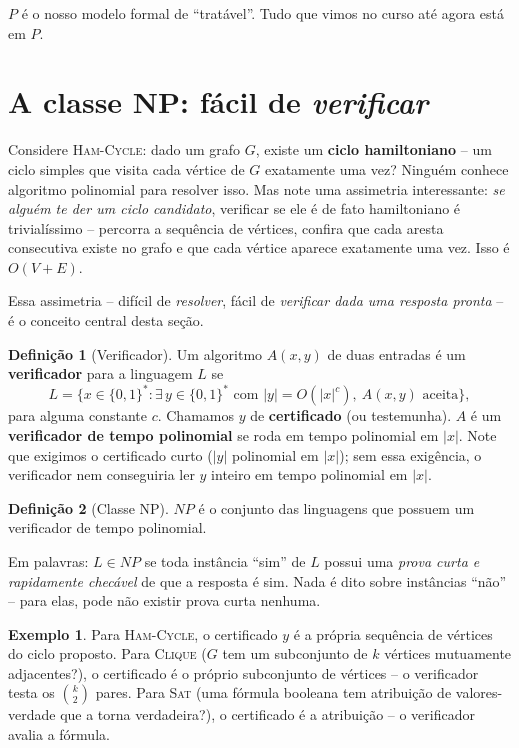 \documentclass[9pt,a4paper]{extarticle}
\newcommand{\impt}[1]{\textcolor{important}{\textbf{#1}}}
\theoremstyle{definition}
\newtheorem{definition}{Definição}[section]
\newtheorem{example}{Exemplo}[section]
\begin{document}
\(P\) é o nosso modelo formal de \enquote{tratável}. Tudo que vimos no curso até agora está em \(P\).

\section{A classe NP: fácil de \emph{verificar}}\label{sec:classe-np}

Considere \textsc{Ham-Cycle}: dado um grafo \(G\), existe um \impt{ciclo hamiltoniano} -- um ciclo simples que visita cada vértice de \(G\) exatamente uma vez? Ninguém conhece algoritmo polinomial para resolver isso. Mas note uma assimetria interessante: \emph{se alguém te der um ciclo candidato}, verificar se ele é de fato hamiltoniano é trivialíssimo -- percorra a sequência de vértices, confira que cada aresta consecutiva existe no grafo e que cada vértice aparece exatamente uma vez. Isso é \(O(V+E)\).

Essa assimetria -- difícil de \emph{resolver}, fácil de \emph{verificar dada uma resposta pronta} -- é o conceito central desta seção.

\begin{definition}[Verificador]\label{def:verificador}
Um algoritmo \(A(x,y)\) de duas entradas é um \impt{verificador} para a linguagem \(L\) se
\[
L = \{x \in \{0,1\}^* : \exists\, y \in \{0,1\}^* \text{ com } |y| = O(|x|^c),\ A(x,y) \text{ aceita}\},
\]
para alguma constante \(c\). Chamamos \(y\) de \impt{certificado} (ou testemunha). \(A\) é um \impt{verificador de tempo polinomial} se roda em tempo polinomial em \(|x|\). Note que exigimos o certificado curto (\(|y|\) polinomial em \(|x|\)); sem essa exigência, o verificador nem conseguiria ler \(y\) inteiro em tempo polinomial em \(|x|\).
\end{definition}

\begin{definition}[Classe NP]
\(NP\) é o conjunto das linguagens que possuem um verificador de tempo polinomial.
\end{definition}

Em palavras: \(L \in NP\) se toda instância \enquote{sim} de \(L\) possui uma \emph{prova curta e rapidamente checável} de que a resposta é sim. Nada é dito sobre instâncias \enquote{não} -- para elas, pode não existir prova curta nenhuma.

\begin{example}
Para \textsc{Ham-Cycle}, o certificado \(y\) é a própria sequência de vértices do ciclo proposto. Para \textsc{Clique} (\(G\) tem um subconjunto de \(k\) vértices mutuamente adjacentes?), o certificado é o próprio subconjunto de vértices -- o verificador testa os \(\binom{k}{2}\) pares. Para \textsc{Sat} (uma fórmula booleana tem atribuição de valores-verdade que a torna verdadeira?), o certificado é a atribuição -- o verificador avalia a fórmula.
\end{example}
\end{document}
